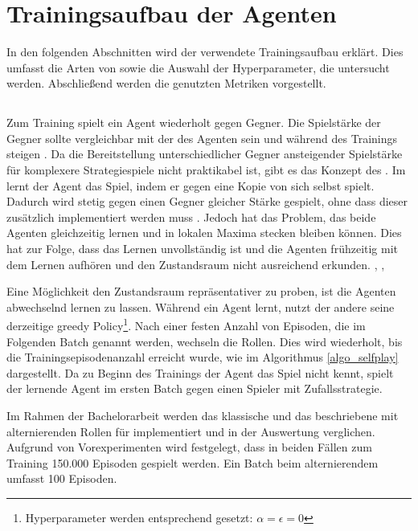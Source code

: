 \section{Trainingsaufbau der Agenten}
In den folgenden Abschnitten wird der verwendete Trainingsaufbau erklärt. 
Dies umfasst die Arten von \splay sowie die Auswahl der Hyperparameter, die untersucht werden.
Abschließend werden die genutzten Metriken vorgestellt.

\subsection{\splay}
Zum Training spielt ein Agent wiederholt gegen Gegner. 
Die Spielstärke der Gegner sollte vergleichbar mit der des Agenten sein und während des Trainings steigen \cite[S.1 ff.]{epsteinIdealTrainer1994}.
Da die Bereitstellung unterschiedlicher Gegner ansteigender Spielstärke für komplexere Strategiespiele nicht praktikabel ist, gibt es das Konzept des \splay. \cite[S. 565f.]{szitaReinforcementLearningGames2012} \cite[S. 1ff.]{digiovanniSurveySelfPlayReinforcement2021}
Im \splay lernt der  Agent das Spiel, indem er gegen eine Kopie von sich selbst spielt. 
Dadurch wird stetig gegen einen Gegner gleicher Stärke gespielt, ohne dass dieser zusätzlich implementiert werden muss \cite[S. 565f.]{szitaReinforcementLearningGames2012}.
Jedoch hat \splay das Problem, das beide Agenten gleichzeitig lernen und in lokalen Maxima stecken bleiben können. 
Dies hat zur Folge, dass das Lernen unvollständig ist und die Agenten frühzeitig mit dem Lernen aufhören und den Zustandsraum nicht ausreichend erkunden. \cite[S. 16]{boyanModularNeuralNetworks1992}, \cite[S. 565f.]{szitaReinforcementLearningGames2012}, \cite{bowlingConvergenceNoRegretMultiagent2004}

Eine Möglichkeit den Zustandsraum repräsentativer zu proben, ist die Agenten abwechselnd lernen zu lassen. 
Während ein Agent lernt, nutzt der andere seine derzeitige  greedy Policy\footnote{Hyperparameter werden entsprechend gesetzt: $\alpha = \epsilon = 0$}.
Nach einer festen Anzahl von Episoden, die im Folgenden Batch genannt werden, wechseln die Rollen. \cite{slatern.GameAiWhy} 
Dies wird wiederholt, bis die Trainingsepisodenanzahl erreicht wurde, wie im Algorithmus \ref{algo_selfplay} dargestellt.
Da zu Beginn des Trainings der Agent das Spiel nicht kennt, spielt der lernende Agent im ersten Batch gegen einen Spieler mit Zufallsstrategie. 

Im Rahmen der Bachelorarbeit werden das klassische \splay und das beschriebene \splay mit alternierenden Rollen für \ttt implementiert und in der Auswertung verglichen. 
Aufgrund von Vorexperimenten wird festgelegt, dass in beiden Fällen zum Training 150.000 Episoden gespielt werden. Ein Batch beim alternierendem \splay umfasst 100 Episoden.

